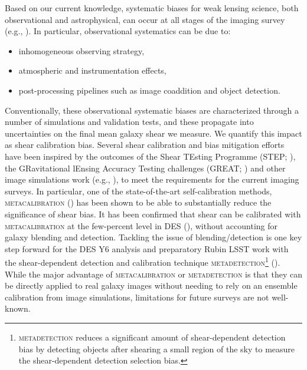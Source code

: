 \documentclass[fleqn,usenatbib]{mnras}
\begin{document}
Based on our current knowledge, systematic biases for weak lensing science, both observational and astrophysical, can occur at all stages of the imaging survey (e.g., \citealt{2018ARA&A..56..393M}). In particular, observational systematics can be due to: 
\begin{itemize}
    \item inhomogeneous observing strategy,
    \item atmospheric and instrumentation effects,
    \item post-processing pipelines such as image coaddition and object detection.
\end{itemize} 
Conventionally, these observational systematic biases are characterized through a number of simulations and validation tests, and these propagate into uncertainties on the final mean galaxy shear we measure. We quantify this impact as shear calibration bias. Several shear calibration and bias mitigation efforts have been inspired by the outcomes of the Shear TEsting Programme (STEP; \citealt{2006MNRAS.368.1323H, 2007MNRAS.376...13M}), the GRavitational lEnsing Accuracy Testing challenges (GREAT; \citealt{2010MNRAS.405.2044B, 2013ApJS..205...12K, 2015MNRAS.450.2963M}) and other image simulations work (e.g., \citealt{2017MNRAS.468.3295H}), to meet the requirements for the current imaging surveys. In particular, one of the state-of-the-art self-calibration methods, \textsc{metacalibration} (\citealt{2017arXiv170202600H, 2017ApJ...841...24S}) has been shown to be able to substantially reduce the significance of shear bias. It has been confirmed that shear can be calibrated with \textsc{metacalibration} at the few-percent level in DES (\citealt{2018MNRAS.481.1149Z, 2020arXiv201103408G}), without accounting for galaxy blending and detection. Tackling the issue of blending/detection is one key step forward for the DES Y6 analysis and preparatory Rubin LSST work with the shear-dependent detection and calibration technique \textsc{metadetection}\footnote{\textsc{metadetection} reduces a significant amount of shear-dependent detection bias by detecting objects after shearing a small region of the sky to measure the shear-dependent detection selection bias. } (\citealt{2020ApJ...902..138S}). While the major advantage of \textsc{metacalibration} or \textsc{metadetection} is that they can be directly applied to real galaxy images without needing to rely on an ensemble calibration from image simulations, limitations for future surveys are not well-known. 
\end{document}

